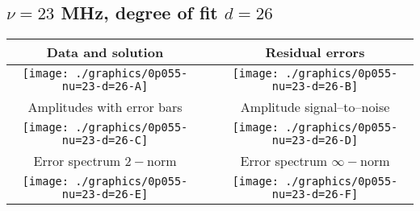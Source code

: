 

% 

\clearpage{}
\break{}

\subsection{$\nu = 23$ MHz, degree of fit $d = 26$}

\begin{table}[h]
    \begin{center}
        \begin{tabular}{ccc}
            Data and solution & \quad & Residual errors \\\hline
            \texttt{[image: ./graphics/0p055-nu=23-d=26-A]} &&
            \texttt{[image: ./graphics/0p055-nu=23-d=26-B]} \\[15pt]
            Amplitudes with error bars && Amplitude signal--to--noise \\\hline
            \texttt{[image: ./graphics/0p055-nu=23-d=26-C]} &&
            \texttt{[image: ./graphics/0p055-nu=23-d=26-D]} \\[15pt]
            Error spectrum $2-$norm && Error spectrum $\infty-$norm \\\hline
            \texttt{[image: ./graphics/0p055-nu=23-d=26-E]} &&
            \texttt{[image: ./graphics/0p055-nu=23-d=26-F]} \\[15pt]
        \end{tabular}
    \end{center}
\label{fig:elev=55, nu=23}
\end{table}



\endinput

